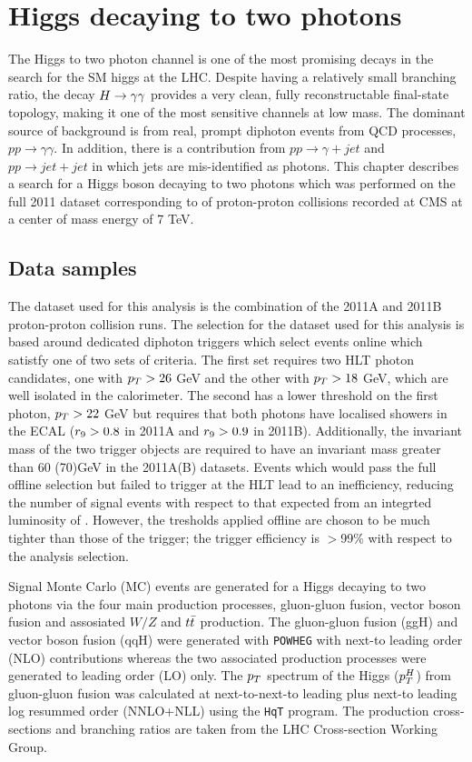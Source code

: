 \chapter{Higgs decaying to two photons}

The Higgs to two photon channel is one of the most promising decays in the search for the SM higgs
at the LHC. Despite having a relatively small branching ratio, the decay $H\rightarrow\gamma\gamma$ 
provides a very clean, fully reconstructable final-state topology, making it 
one of the most sensitive channels at low mass.
The dominant source of background is from real, prompt diphoton events from QCD 
processes, $pp\rightarrow\gamma\gamma$.
In addition, there is a contribution from $pp\rightarrow\gamma+jet$ and $pp\rightarrow jet+jet$
in which jets are mis-identified as photons.
This chapter describes a search for a Higgs boson decaying to two photons
which was performed on the full 2011 dataset 
corresponding to \clumi of proton-proton collisions recorded at CMS at a center of mass energy of 7 TeV.

\section{Data samples}
\label{sec:datasamples}

The dataset used for this analysis is the combination of the 2011A and 2011B 
proton-proton collision runs.
The selection for the dataset used for this analysis is based around dedicated diphoton triggers
which select events online which satistfy one of two sets of criteria.
The first set requires two HLT photon candidates, one with $p_{T}>26$ GeV and the other with 
$p_{T}>18$ GeV, which are well isolated in the calorimeter. The second has a lower threshold on
the first photon, $p_{T}>22$ GeV but requires that both photons have localised showers in the ECAL 
($r_{9}>0.8$ in 2011A and $r_{9}>0.9$ in 2011B). 
Additionally, the invariant mass of the two trigger objects are required to have an 
invariant mass greater than 60 (70)GeV in the 2011A(B) datasets.
Events which would pass the full offline selection but failed to trigger at the HLT lead to an inefficiency, 
reducing the number of signal events with respect to that expected from an integrted luminosity of \clumi.
However, the tresholds applied offline are choson to be much tighter than those of the trigger;
the trigger efficiency is $>$99\% with respect to the analysis selection. 

Signal Monte Carlo (MC) events are generated for a Higgs decaying to two photons via the four main 
production processes, gluon-gluon fusion, vector boson fusion and assosiated $W/Z$ and $t\bar{t}$ production.
The gluon-gluon fusion (ggH) and vector boson fusion (qqH) were generated with \texttt{POWHEG} with 
next-to leading order (NLO) contributions whereas
the two associated production processes were generated to leading order (LO) only.
The $p_{T}$ spectrum of the Higgs ($p_{T}^{H}$) from gluon-gluon fusion was calculated at
next-to-next-to leading plus next-to leading log resummed order (NNLO+NLL) using the \texttt{HqT} program.
The production cross-sections and branching ratios are taken from the LHC Cross-section Working Group.

